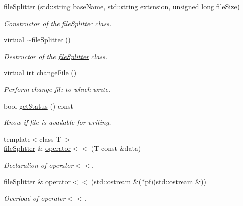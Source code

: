 \begin{DoxyCompactItemize}
\item 
\hyperlink{classdwf__utils_1_1file_splitter_a27918f5fa4901061ed6d3253f81cb2df}{file\-Splitter} (std\-::string base\-Name, std\-::string extension, unsigned long file\-Size)
\begin{DoxyCompactList}\small\item\em \-Constructor of the \hyperlink{classdwf__utils_1_1file_splitter}{file\-Splitter} class. \end{DoxyCompactList}\item 
virtual \hyperlink{classdwf__utils_1_1file_splitter_a6990a38b7784065e7165b0ab99077d54}{$\sim$file\-Splitter} ()
\begin{DoxyCompactList}\small\item\em \-Destructor of the \hyperlink{classdwf__utils_1_1file_splitter}{file\-Splitter} class. \end{DoxyCompactList}\item 
virtual int \hyperlink{classdwf__utils_1_1file_splitter_a6182c9c9591ef7987d976b92c94372a1}{change\-File} ()
\begin{DoxyCompactList}\small\item\em \-Perform change file to which write. \end{DoxyCompactList}\item 
bool \hyperlink{classdwf__utils_1_1file_splitter_ad3e714de53d3ba6feb52f2ef0b9acc59}{get\-Status} () const 
\begin{DoxyCompactList}\small\item\em \-Know if file is available for writing. \end{DoxyCompactList}\item 
{\footnotesize template$<$class T $>$ }\\\hyperlink{classdwf__utils_1_1file_splitter}{file\-Splitter} \& \hyperlink{classdwf__utils_1_1file_splitter_a0d36c6b9bbcb2399fad313b468d455ec}{operator$<$$<$} (\-T const \&data)
\begin{DoxyCompactList}\small\item\em \-Declaration of operator$<$$<$. \end{DoxyCompactList}\item 
\hyperlink{classdwf__utils_1_1file_splitter}{file\-Splitter} \& \hyperlink{classdwf__utils_1_1file_splitter_a117a762a531b8472f865d5dc3b1e615d}{operator$<$$<$} (std\-::ostream \&($\ast$pf)(std\-::ostream \&))
\begin{DoxyCompactList}\small\item\em \-Overload of operator$<$$<$. \end{DoxyCompactList}\end{DoxyCompactItemize}
